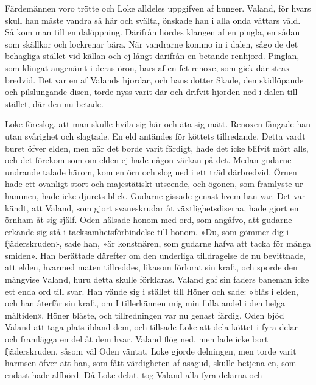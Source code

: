 Färdemännen voro trötte och Loke alldeles uppgifven af hunger. Valand,
för hvars skull han måste vandra så här och svälta, önskade han i alla
onda vättars våld. Så kom man till en dalöppning. Därifrån hördes
klangen af en pingla, en sådan som skällkor och lockrenar bära. När
vandrarne
kommo in i dalen, sågo de det behagliga stället vid källan och ej långt
därifrån en betande renhjord. Pinglan, som klingat angenämt i deras
öron, bars af en fet renoxe, som gick där strax bredvid. Det var en af
Valands hjordar, och hans dotter Skade, den skidlöpande och pilslungande
disen, torde nyss varit där och drifvit hjorden ned i dalen till
stället, där den nu betade.

Loke föreslog, att man skulle hvila sig här och äta sig mätt. Renoxen
fångade han utan svårighet och slagtade. En eld antändes för köttets
tillredande. Detta vardt buret öfver elden, men när det borde varit
färdigt, hade det icke blifvit mört alls, och det förekom som om elden
ej hade någon värkan på det. Medan gudarne undrande talade härom, kom en
örn och slog ned i ett träd därbredvid. Örnen hade ett ovanligt stort
och majestätiskt utseende, och ögonen, som framlyste ur hammen, hade
icke djurets blick. Gudarne gissade genast hvem han var. Det var kändt,
att Valand, som gjort svaneskrudar åt växtlighetsdiserna, hade gjort en
örnham åt sig själf. Oden hälsade honom med ord, som angåfvo, att
gudarne erkände sig stå i tacksamhetsförbindelse till honom. »Du, som
gömmer dig i fjäderskruden», sade han, »är konstnären, som gudarne hafva
att tacka för många smiden». Han berättade därefter om den underliga
tilldragelse de nu bevittnade, att elden, hvarmed maten tillreddes,
likasom förlorat sin kraft, och sporde den mångvise Valand, huru detta
skulle förklaras. Valand gaf sin faders baneman icke ett enda ord till
svar. Han vände sig i stället till Höner och sade: »blås i elden, och
han återfår sin kraft, om I tillerkännen mig min fulla andel i den helga
måltiden». Höner blåste, och tillredningen var nu genast färdig. Oden
bjöd Valand att taga plats ibland dem, och tillsade Loke att dela köttet
i fyra delar och framlägga en del åt dem hvar. Valand flög ned, men lade
icke bort fjäderskruden, såsom väl Oden väntat. Loke gjorde delningen,
men torde varit harmsen öfver att han, som fått värdigheten af asagud,
skulle betjena en, som endast hade alfbörd. Då Loke delat, tog Valand
alla fyra delarna och


